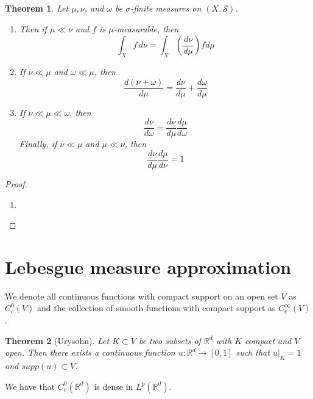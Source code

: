 \documentclass{article}
\newtheorem{theorem}{Theorem}
\theoremstyle{definition}
\numberwithin{theorem}{section}
\numberwithin{equation}{section}
\begin{document}
\begin{theorem}
	Let $\mu, \nu$, and $\omega$ be $\sigma$-finite measures on $(X, \mathcal{S})$.
	\begin{enumerate}
		\item Then if $\mu \ll \nu$ and $f$ is $\mu$-measurable, then
		\begin{equation}
			\int_X f \, d\nu = \int_X (\dfrac{d\nu}{d\mu}) f d\mu
		\end{equation}
		\item If $\nu \ll \mu$ and $\omega \ll \mu$, then
		\begin{equation}
			\dfrac{d(\nu + \omega)}{d\mu} = \dfrac{d\nu}{d\mu} + \dfrac{d\omega}{d\mu}
		\end{equation}
		\item If $\nu \ll \mu \ll \omega$, then
		\begin{equation}
			\dfrac{d\nu}{d\omega} = \dfrac{d\nu}{d\mu} \dfrac{d\mu}{d\omega}
		\end{equation}
		Finally, if $\nu \ll \mu$ and $\mu \ll \nu$, then
		\begin{equation}
			\dfrac{d\nu}{d\mu} \dfrac{d\mu}{d\nu} = 1
		\end{equation}
	\end{enumerate}
\end{theorem}

\begin{proof}
	\begin{enumerate}
		\item 
	\end{enumerate}
\end{proof}

\section{Lebesgue measure approximation}
We denote all continuous functions with compact support on an open set $V$ as $C^0_c(V)$ and the collection of smooth functions with compact support as $C^\infty_c(V)$. 
\begin{theorem}[Urysohn]
	Let $K \subset V$ be two subsets of $\mathbb{R}^d$ with $K$ compact and $V$ open. Then there exists a continuous function $u: \mathbb{R}^d  \rightarrow [0, 1]$ such that $u|_K = 1$ and $supp(u) \subset V$. 
\end{theorem}

We have that $C^0_c(\mathbb{R}^d)$ is dense in $L^p(\mathbb{R}^d)$. 
\end{document}
